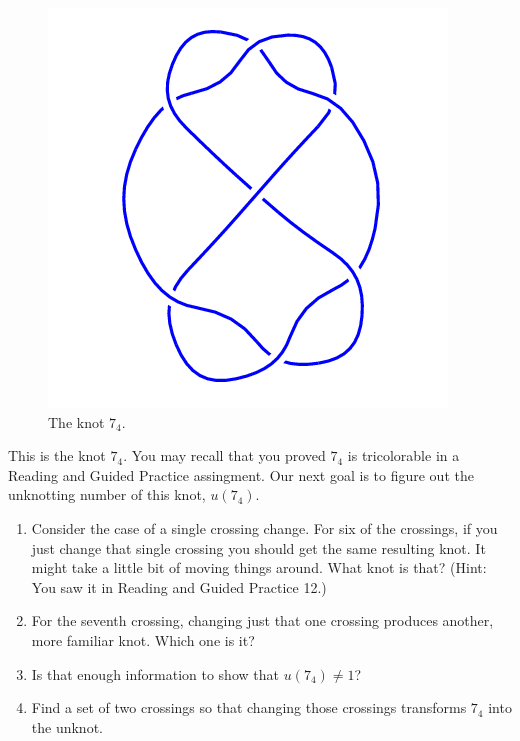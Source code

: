 \documentclass[12pt,letterpaper]{article}
\theoremstyle{definition}
\begin{document}
\begin{figure}
    \centering
    \includegraphics[width=.3\textwidth]{knotpics/7_4.png}
    \caption{The knot $7_4$.}
\end{figure}
This is the knot $7_4$. 
You may recall that you proved $7_4$ is tricolorable in a Reading and Guided Practice assingment.
Our next goal is to figure out the unknotting number of this knot, $u(7_4)$.
\begin{enumerate}
\item Consider the case of a single crossing change.
For six of the crossings, if you just change that single crossing you should get the same resulting knot.
It might take a little bit of moving things around.
What knot is that?
(Hint: You saw it in Reading and Guided Practice 12.)

\item For the seventh crossing, changing just that one crossing produces another, more familiar knot. 
Which one is it?

\item Is that enough information to show that $u(7_4) \neq 1$?

\item Find a set of two crossings so that changing those crossings transforms $7_4$ into the unknot.
\end{enumerate}
\end{document}
